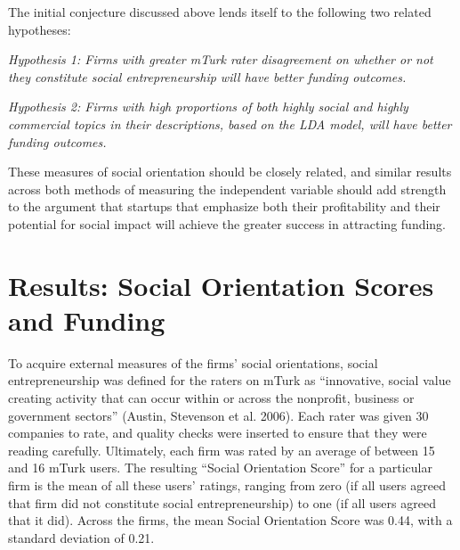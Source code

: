 \documentclass[12pt]{article}
\begin{document}
The initial conjecture discussed above lends itself to the following two related hypotheses:

\textit{Hypothesis 1: Firms with greater mTurk rater disagreement on whether or not they constitute social entrepreneurship will have better funding outcomes.}

\textit{Hypothesis 2: Firms with high proportions of both highly social and highly commercial topics in their descriptions, based on the LDA model, will have better funding outcomes.}

These measures of social orientation should be closely related, and similar results across both methods of measuring the independent variable should add strength to the argument that startups that emphasize both their profitability and their potential for social impact will achieve the greater success in attracting funding.


\section{Results: Social Orientation Scores and Funding}

To acquire external measures of the firms' social orientations, social entrepreneurship was defined for the raters on mTurk as ``innovative, social value creating activity that can occur within or across the nonprofit, business or government sectors'' (Austin, Stevenson et al. 2006). Each rater was given 30 companies to rate, and quality checks were inserted to ensure that they were reading carefully. Ultimately, each firm was rated by an average of between 15 and 16 mTurk users. The resulting ``Social Orientation Score'' for a particular firm is the mean of all these users' ratings, ranging from zero (if all users agreed that firm did not constitute social entrepreneurship) to one (if all users agreed that it did). Across the firms, the mean Social Orientation Score was 0.44, with a standard deviation of 0.21. 
\end{document}
